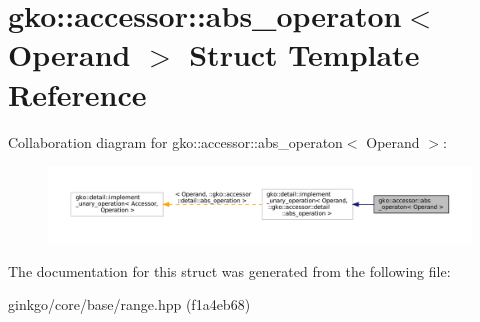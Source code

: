 \hypertarget{structgko_1_1accessor_1_1abs__operaton}{}\section{gko\+:\+:accessor\+:\+:abs\+\_\+operaton$<$ Operand $>$ Struct Template Reference}
\label{structgko_1_1accessor_1_1abs__operaton}


Collaboration diagram for gko\+:\+:accessor\+:\+:abs\+\_\+operaton$<$ Operand $>$\+:
\nopagebreak
\begin{figure}[H]
\begin{center}
\leavevmode
\includegraphics[width=350pt]{structgko_1_1accessor_1_1abs__operaton__coll__graph}
\end{center}
\end{figure}


The documentation for this struct was generated from the following file\+:\begin{DoxyCompactItemize}
\item 
ginkgo/core/base/range.\+hpp (f1a4eb68)\end{DoxyCompactItemize}
